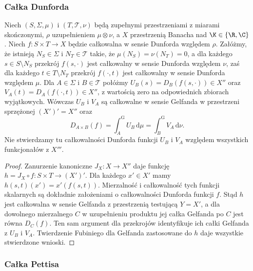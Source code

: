 \subsubsection{Całka Dunforda}

\begin{twierdzenie}
\label{thm:dunford-fubini15b}
Niech $(S,\Sigma,\mu)$ i $(T,\mathcal T,\nu)$ będą
zupełnymi przestrzeniami z miarami skończonymi,
$\rho$ uzupełnieniem $\mu\otimes\nu$, a $X$ przestrzenią
Banacha nad $\K\in\{\R,\C\}$.
Niech $f:S\times T\to X$ będzie całkowalna w sensie
Dunforda względem $\rho$. Załóżmy, że istnieją
$N_S\in\Sigma$ i $N_T\in\mathcal T$ takie, że
$\mu(N_S)=\nu(N_T)=0$, a dla każdego $s\in S\setminus N_S$
przekrój $f(s,\cdot)$ jest całkowalny w sensie Dunforda
względem $\nu$, zaś dla każdego $t\in T\setminus N_T$
przekrój $f(\cdot,t)$ jest całkowalny w sensie Dunforda
względem $\mu$.
Dla $A\in\Sigma$ i $B\in\mathcal T$ połóżmy
$U_B(s)=D_B(f(s,\cdot))\in X''$ oraz
$V_A(t)=D_A(f(\cdot,t))\in X''$, z wartością zero
na odpowiednich zbiorach wyjątkowych.
Wówczas $U_B$ i $V_A$ są całkowalne w sensie Gelfanda
w przestrzeni sprzężonej $(X')'=X''$ oraz
\[
 D_{A\times B}(f)=
 \int_A^{\mathrm G}U_B\,\mathrm d\mu
 =\int_B^{\mathrm G}V_A\,\mathrm d\nu.
\]
Nie stwierdzamy tu całkowalności Dunforda funkcji
$U_B$ i $V_A$ względem wszystkich funkcjonałów z $X'''$.
\end{twierdzenie}
\begin{proof}
Zanurzenie kanoniczne $J_X:X\to X''$ daje funkcję
$h=J_X\circ f:S\times T\to (X')'$. Dla każdego $x'\in X'$
mamy $h(s,t)(x')=x'(f(s,t))$. Mierzalność i całkowalność
tych funkcji skalarnych są dokładnie założeniami
o całkowalności Dunforda funkcji $f$. Stąd $h$ jest
całkowalna w sensie Gelfanda z przestrzenią testującą
$Y=X'$, a dla dowolnego mierzalnego $C$ w uzupełnieniu
produktu jej całka Gelfanda po $C$ jest równa $D_C(f)$.
Ten sam argument dla przekrojów identyfikuje ich całki
Gelfanda z $U_B$ i $V_A$. Twierdzenie Fubiniego
dla Gelfanda zastosowane do $h$ daje wszystkie
stwierdzone wnioski.
\end{proof}

\subsubsection{Całka Pettisa}

